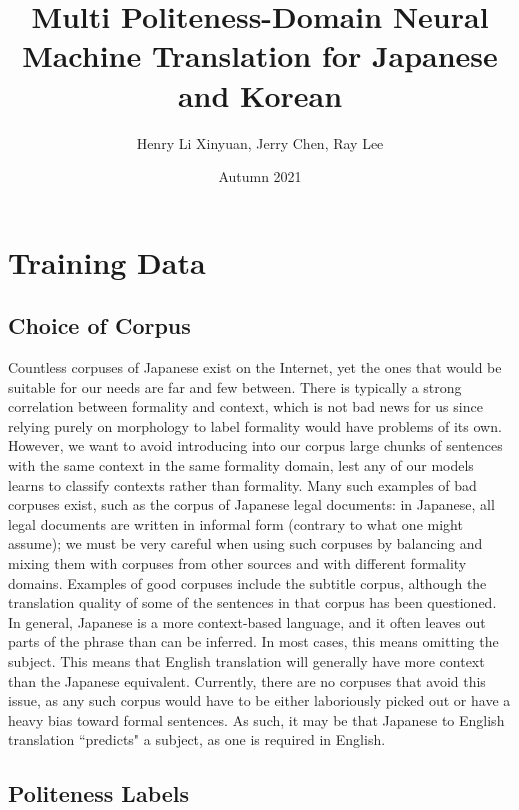 \documentclass[11pt]{article}
\begin{document}
\title{Multi Politeness-Domain Neural Machine Translation for Japanese and Korean}

\author{Henry Li Xinyuan, Jerry Chen, Ray Lee}

\date{Autumn 2021}

\maketitle

\newpage

\section{Training Data}

\subsection{Choice of Corpus}

Countless corpuses of Japanese exist on the Internet, yet the ones that would be suitable for our needs are far and few between. There is typically a strong correlation between formality and context, which is not bad news for us since relying purely on morphology to label formality would have problems of its own. However, we want to avoid introducing into our corpus large chunks of sentences with the same context in the same formality domain, lest any of our models learns to classify contexts rather than formality. Many such examples of bad corpuses exist, such as the corpus of Japanese legal documents: in Japanese, all legal documents are written in informal form (contrary to what one might assume); we must be very careful when using such corpuses by balancing and mixing them with corpuses from other sources and with different formality domains. Examples of good corpuses include the subtitle corpus, although the translation quality of some of the sentences in that corpus has been questioned. In general, Japanese is a more context-based language, and it often leaves out parts of the phrase than can be inferred. In most cases, this means omitting the subject. This means that English translation will generally have more context than the Japanese equivalent. Currently, there are no corpuses that avoid this issue, as any such corpus would have to be either laboriously picked out or have a heavy bias toward formal sentences. As such, it may be that Japanese to English translation ``predicts" a subject, as one is required in English. 

\subsection{Politeness Labels}
\end{document}
